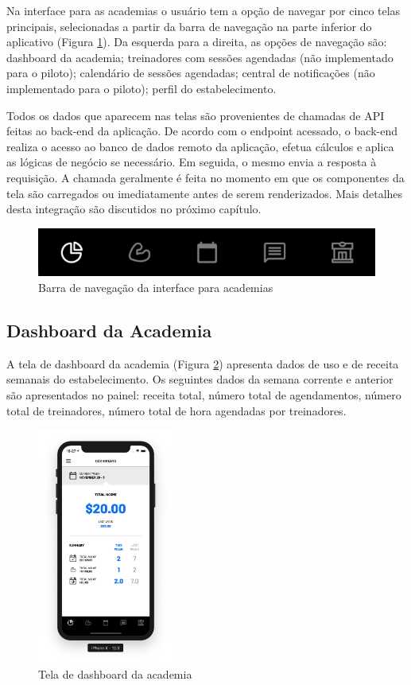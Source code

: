 Na interface para as academias o usuário tem a opção de navegar por cinco telas principais, selecionadas a partir da barra de navegação na parte inferior do aplicativo (Figura \ref{fig:gym-tabbar}). Da esquerda para a direita, as opções de navegação são: dashboard da academia; treinadores com sessões agendadas (não implementado para o piloto); calendário de sessões agendadas; central de notificações (não implementado para o piloto); perfil do estabelecimento.

Todos os dados que aparecem nas telas são provenientes de chamadas de API feitas ao back-end da aplicação. De acordo com o endpoint acessado, o back-end realiza o acesso ao banco de dados remoto da aplicação, efetua cálculos e aplica as lógicas de negócio se necessário. Em seguida, o mesmo envia a resposta à requisição. A chamada geralmente é feita no momento em que os componentes da tela são carregados ou imediatamente antes de serem renderizados. Mais detalhes desta integração são discutidos no próximo capítulo.

\begin{figure}[H]
    \centering
    \includegraphics{pfc/figuras/gym-tabbar.png}
    \caption{Barra de navegação da interface para academias}
    \label{fig:gym-tabbar}
\end{figure}


\subsection{Dashboard da Academia}
A tela de dashboard da academia (Figura \ref{fig:gym-dashboard}) apresenta dados de uso e de receita semanais do estabelecimento. Os seguintes dados da semana corrente e anterior são apresentados no painel: receita total, número total de agendamentos, número total de treinadores, número total de hora agendadas por treinadores.

\begin{figure}[H]
    \centering
    \includegraphics[width=0.4\textwidth]{pfc/figuras/gym-dashboard.png}
    \caption{Tela de dashboard da academia}
    \label{fig:gym-dashboard}
\end{figure}

